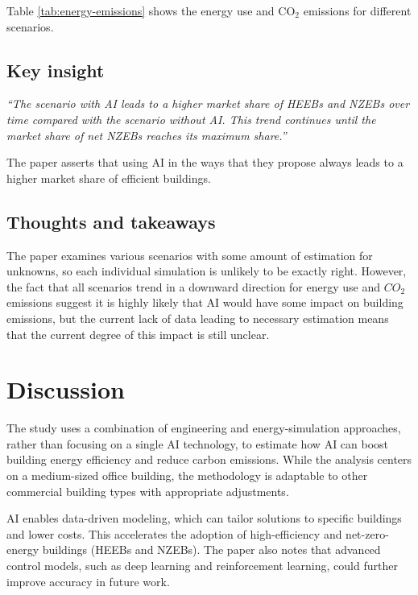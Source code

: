 \documentclass[conference,a4paper]{IEEEtran}
\begin{document}
Table \ref{tab:energy-emissions} shows the energy use and CO$_2$ emissions for different scenarios.


\subsection*{Key insight}

\textit{“The scenario with AI leads to a higher market share of HEEBs and NZEBs over time compared with the scenario without AI. This trend continues until the market share of net NZEBs reaches its maximum share.”}

The paper asserts that using AI in the ways that they propose always leads to a higher market share of efficient buildings. 

\subsection*{Thoughts and takeaways}
The paper examines various scenarios with some amount of estimation for unknowns, so each individual simulation is unlikely to be exactly right. However, the fact that all scenarios trend in a downward direction for energy use and $CO_2$ emissions suggest it is highly likely that AI would have some impact on building emissions, but the current lack of data leading to necessary estimation means that the current degree of this impact is still unclear.


\section*{Discussion}

The study uses a combination of engineering and energy-simulation approaches, rather than focusing on a single AI technology, to estimate how AI can boost building energy efficiency and reduce carbon emissions. While the analysis centers on a medium-sized office building, the methodology is adaptable to other commercial building types with appropriate adjustments.

AI enables data-driven modeling, which can tailor solutions to specific buildings and lower costs. This accelerates the adoption of high-efficiency and net-zero-energy buildings (HEEBs and NZEBs). The paper also notes that advanced control models, such as deep learning and reinforcement learning, could further improve accuracy in future work.
\end{document}
